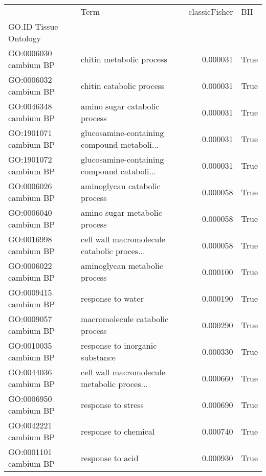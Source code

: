 \begin{tabular}{llrl}
\toprule
{} &                                         Term &  classicFisher &     BH \\
GO.ID      Tissue  Ontology &                                              &                &        \\
GO:0006030 cambium BP       &                     chitin metabolic process &       0.000031 &   True \\
\midrule
GO:0006032 cambium BP       &                     chitin catabolic process &       0.000031 &   True \\
GO:0046348 cambium BP       &                amino sugar catabolic process &       0.000031 &   True \\
GO:1901071 cambium BP       &  glucosamine-containing compound metaboli... &       0.000031 &   True \\
GO:1901072 cambium BP       &  glucosamine-containing compound cataboli... &       0.000031 &   True \\
GO:0006026 cambium BP       &                aminoglycan catabolic process &       0.000058 &   True \\
GO:0006040 cambium BP       &                amino sugar metabolic process &       0.000058 &   True \\
GO:0016998 cambium BP       &  cell wall macromolecule catabolic proces... &       0.000058 &   True \\
GO:0006022 cambium BP       &                aminoglycan metabolic process &       0.000100 &   True \\
GO:0009415 cambium BP       &                            response to water &       0.000190 &   True \\
GO:0009057 cambium BP       &              macromolecule catabolic process &       0.000290 &   True \\
GO:0010035 cambium BP       &              response to inorganic substance &       0.000330 &   True \\
GO:0044036 cambium BP       &  cell wall macromolecule metabolic proces... &       0.000660 &   True \\
GO:0006950 cambium BP       &                           response to stress &       0.000690 &   True \\
GO:0042221 cambium BP       &                         response to chemical &       0.000740 &   True \\
GO:0001101 cambium BP       &                             response to acid &       0.000930 &   True \\

\end{tabular}
